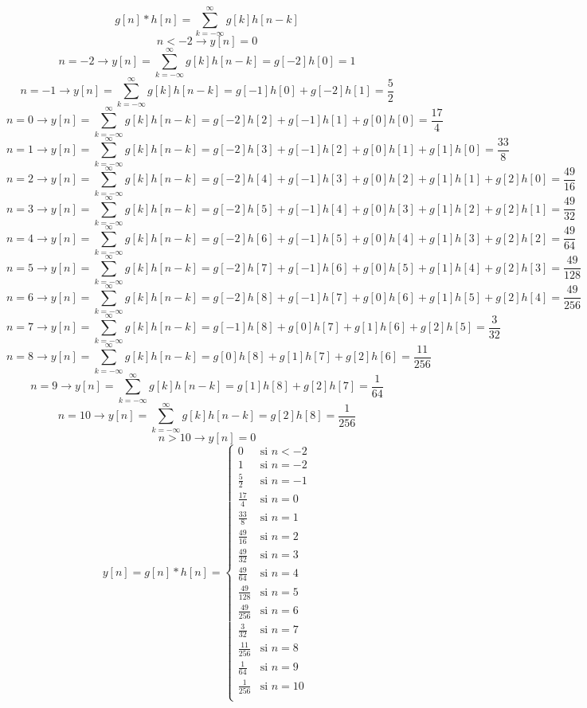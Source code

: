 \documentclass[11pt,a4paper]{article}
\begin{document}
{{\begin{enumerate}
$$g[n]*h[n]=\sum_{k=-\infty}^{\infty}g[k]h[n-k]$$
$$n<-2 \rightarrow y[n]=0 $$
$$n=-2 \rightarrow y[n]=\sum_{k=-\infty}^{\infty}g[k]h[n-k]=g[-2]h[0]=1 $$
$$n=-1 \rightarrow y[n]= \sum_{k=-\infty}^{\infty}g[k]h[n-k]=g[-1]h[0]+g[-2]h[1]=\frac{5}{2} $$
$$n=0 \rightarrow y[n]= \sum_{k=-\infty}^{\infty}g[k]h[n-k]=g[-2]h[2]+g[-1]h[1]+g[0]h[0]=\frac{17}{4} $$
$$n=1 \rightarrow y[n]= \sum_{k=-\infty}^{\infty}g[k]h[n-k]=g[-2]h[3]+g[-1]h[2]+g[0]h[1]+g[1]h[0]=\frac{33}{8} $$
$$n=2 \rightarrow y[n]= \sum_{k=-\infty}^{\infty}g[k]h[n-k]=g[-2]h[4]+g[-1]h[3]+g[0]h[2]+g[1]h[1]+g[2]h[0]=\frac{49}{16} $$
$$n=3 \rightarrow y[n]= \sum_{k=-\infty}^{\infty}g[k]h[n-k]=g[-2]h[5]+g[-1]h[4]+g[0]h[3]+g[1]h[2]+g[2]h[1] =\frac{49}{32}$$
$$n=4 \rightarrow y[n]= \sum_{k=-\infty}^{\infty}g[k]h[n-k]=g[-2]h[6]+g[-1]h[5]+g[0]h[4]+g[1]h[3]+g[2]h[2]=\frac{49}{64} $$
$$n=5 \rightarrow y[n]= \sum_{k=-\infty}^{\infty}g[k]h[n-k]=g[-2]h[7]+g[-1]h[6]+g[0]h[5]+g[1]h[4]+g[2]h[3]=\frac{49}{128} $$
$$n=6 \rightarrow y[n]= \sum_{k=-\infty}^{\infty}g[k]h[n-k]=g[-2]h[8]+g[-1]h[7]+g[0]h[6]+g[1]h[5]+g[2]h[4]=\frac{49}{256} $$
$$n=7 \rightarrow y[n]= \sum_{k=-\infty}^{\infty}g[k]h[n-k]=g[-1]h[8]+g[0]h[7]+g[1]h[6]+g[2]h[5]=\frac{3}{32} $$
$$n=8 \rightarrow y[n]= \sum_{k=-\infty}^{\infty}g[k]h[n-k]=g[0]h[8]+g[1]h[7]+g[2]h[6] =\frac{11}{256}$$
$$n=9 \rightarrow y[n]= \sum_{k=-\infty}^{\infty}g[k]h[n-k]=g[1]h[8]+g[2]h[7]=\frac{1}{64} $$
$$n=10 \rightarrow y[n]= \sum_{k=-\infty}^{\infty}g[k]h[n-k]=g[2]h[8]=\frac{1}{256}$$
$$n>10 \rightarrow y[n]=0 $$
\begin{equation*}
y[n]=g[n]*h[n] =
\begin{cases}
0 & \text{si $n<-2 $}\\
1 & \text{si $n= -2$}\\
\frac{5}{2} & \text{si $n= -1$}\\
\frac{17}{4} & \text{si $n= 0$}\\
\frac{33}{8} & \text{si $n= 1$}\\
\frac{49}{16} & \text{si $n= 2$}\\
\frac{49}{32} & \text{si $n= 3$}\\
\frac{49}{64} & \text{si $n=4$}\\
\frac{49}{128} & \text{si $n=5$}\\
\frac{49}{256} & \text{si $n=6$}\\
\frac{3}{32} & \text{si $n=7$}\\
\frac{11}{256} & \text{si $n=8$}\\
\frac{1}{64} & \text{si $n=9$}\\
\frac{1}{256} & \text{si $n=10$}\\

\end{cases}
\end{equation*}
\end{enumerate}}}
\end{document}
